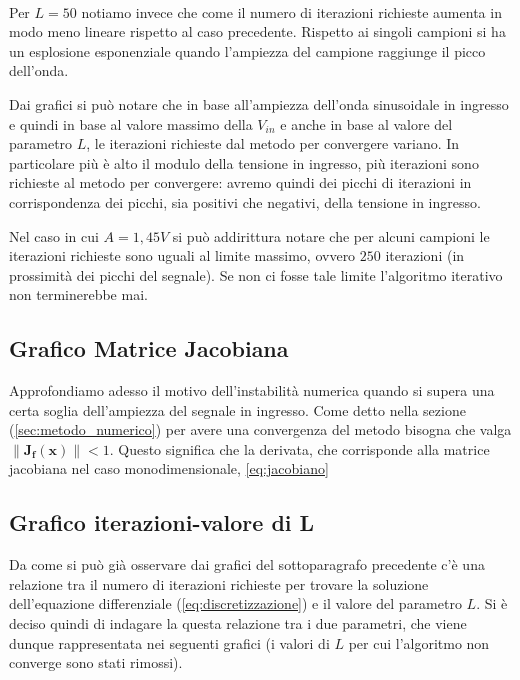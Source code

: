 			\quad\\

			Per $L = 50$ notiamo invece che come il numero di iterazioni richieste aumenta in modo meno lineare rispetto al caso precedente. Rispetto ai singoli campioni si ha un esplosione esponenziale quando l'ampiezza del campione raggiunge il picco dell'onda.
			\graficospace
			\graficospace
			
			Dai grafici si può notare che in base all'ampiezza dell'onda sinusoidale in ingresso e quindi in base al valore massimo della $V_{in}$ e anche in base al valore del parametro $L$, le iterazioni richieste dal metodo per convergere variano. In particolare più è alto il modulo della tensione in ingresso, più iterazioni sono richieste al metodo per convergere: avremo quindi dei picchi di iterazioni in corrispondenza dei picchi, sia positivi che negativi, della tensione in ingresso.
			
			Nel caso in cui $A = 1,45V$ si può addirittura notare che per alcuni campioni le iterazioni richieste sono uguali al limite massimo, ovvero $250$ iterazioni (in prossimità dei picchi del segnale). Se non ci fosse tale limite l'algoritmo iterativo non terminerebbe mai.
			\pagebreak
			
		\subsection{Grafico Matrice Jacobiana}
			Approfondiamo adesso il motivo dell'instabilità numerica quando si supera una certa soglia dell'ampiezza del segnale in ingresso. Come detto nella sezione (\ref{sec:metodo_numerico}) per avere una convergenza del metodo bisogna che valga $\lVert\mathbf{J_{f}(x)}\rVert < 1$. Questo significa che la derivata, che corrisponde alla matrice jacobiana nel caso monodimensionale, \ref{eq:jacobiano}
			
		\subsection{Grafico iterazioni-valore di L}
			Da come si può già osservare dai grafici del sottoparagrafo precedente c'è una relazione tra il numero di iterazioni richieste per trovare la soluzione dell'equazione differenziale (\ref{eq:discretizzazione}) e il valore del parametro $L$. Si è deciso quindi di indagare la questa relazione tra i due parametri, che viene dunque rappresentata nei seguenti grafici (i valori di $L$ per cui l'algoritmo non converge sono stati rimossi).
			

